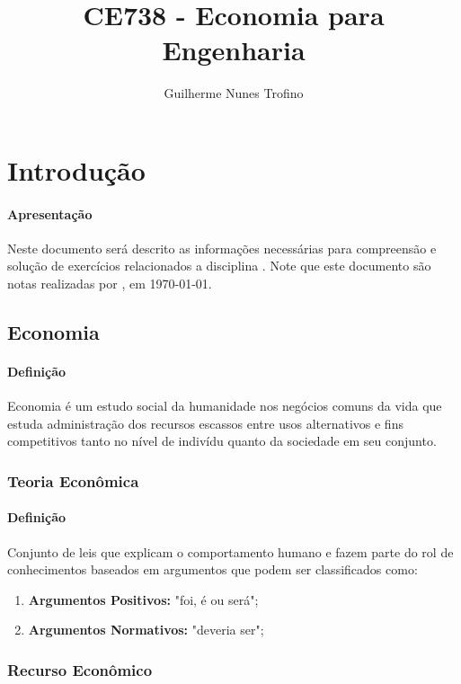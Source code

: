 \documentclass{article}
\title{CE738 - Economia para Engenharia}
\author{Guilherme Nunes Trofino}
\begin{document}
    \maketitle
\newpage

    \tableofcontents
\newpage

    \section{Introdução}
        \paragraph{Apresentação}Neste documento será descrito as informações necessárias para compreensão e solução de exercícios relacionados a disciplina \thetitle . Note que este documento são notas realizadas por \theauthor , em \today.

        \subsection{Economia}
            \paragraph{Definição}Economia é um estudo social da humanidade nos negócios comuns da vida que estuda administração dos recursos escassos entre usos alternativos e fins competitivos tanto no nível de indivídu quanto da sociedade em seu conjunto.

            \subsubsection{Teoria Econômica}
                \paragraph{Definição}Conjunto de leis que explicam o comportamento humano e fazem parte do rol de conhecimentos baseados em argumentos que podem ser classificados como:
                    \begin{enumerate}[noitemsep]
                        \item \textbf{Argumentos Positivos:} "foi, é ou será"; 
                        \item \textbf{Argumentos Normativos:} "deveria ser"; 
                    \end{enumerate}

            \subsubsection{Recurso Econômico}
\end{document}
